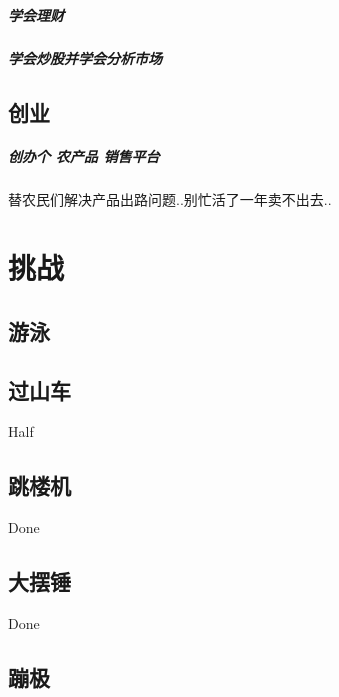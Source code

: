 \documentclass[UTF8,a4paper,8pt]{ctexbook}
\begin{document}
	    \paragraph{学会理财}
	    \paragraph{学会炒股并学会分析市场}
	    
	\section{创业}
	    \paragraph{创办个 农产品 销售平台}替农民们解决产品出路问题..别忙活了一年卖不出去..
   
\chapter{挑战}
	\section{游泳}
		
		
	\section{过山车}
		Half 
		
	\section{跳楼机}    
		Done
		
	\section{大摆锤}
		Done
		
    \section{蹦极}
    
    
\end{document}
